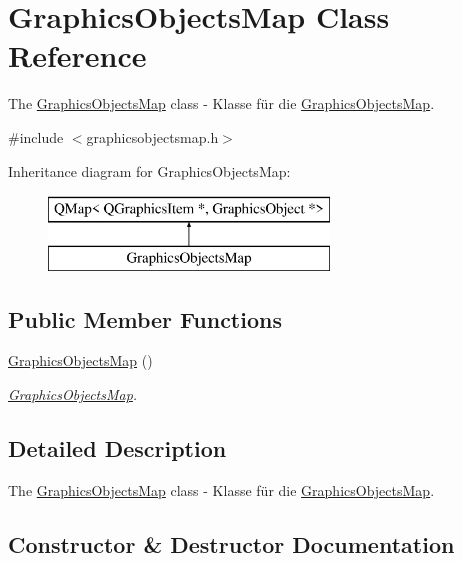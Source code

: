 \hypertarget{class_graphics_objects_map}{}\section{Graphics\+Objects\+Map Class Reference}
\label{class_graphics_objects_map}


The \hyperlink{class_graphics_objects_map}{Graphics\+Objects\+Map} class -\/ Klasse für die \hyperlink{class_graphics_objects_map}{Graphics\+Objects\+Map}.  




{\ttfamily \#include $<$graphicsobjectsmap.\+h$>$}

Inheritance diagram for Graphics\+Objects\+Map\+:\begin{figure}[H]
\begin{center}
\leavevmode
\includegraphics[height=2.000000cm]{class_graphics_objects_map}
\end{center}
\end{figure}
\subsection*{Public Member Functions}
\begin{DoxyCompactItemize}
\item 
\hyperlink{class_graphics_objects_map_a15a79dc2d1a2ab517cf5c5ccce3f05bc}{Graphics\+Objects\+Map} ()
\begin{DoxyCompactList}\small\item\em \hyperlink{class_graphics_objects_map}{Graphics\+Objects\+Map}. \end{DoxyCompactList}\end{DoxyCompactItemize}


\subsection{Detailed Description}
The \hyperlink{class_graphics_objects_map}{Graphics\+Objects\+Map} class -\/ Klasse für die \hyperlink{class_graphics_objects_map}{Graphics\+Objects\+Map}. 

\subsection{Constructor \& Destructor Documentation}
\mbox{\label{class_graphics_objects_map_a15a79dc2d1a2ab517cf5c5ccce3f05bc}} 
